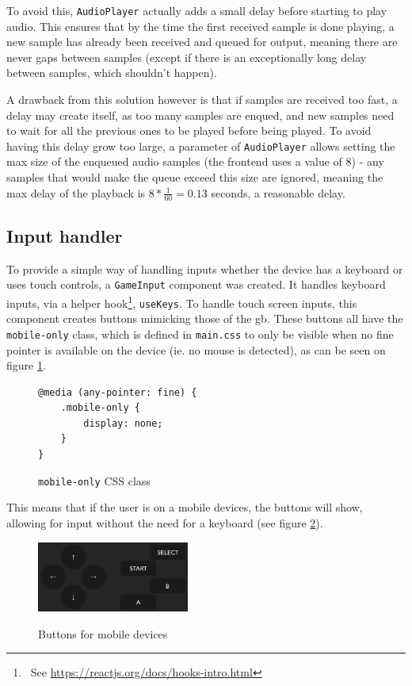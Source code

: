 \documentclass[11pt]{report}
\newcommand{\ftnt}[1]{\footnote{~See \url{#1}}}
\begin{document}
To avoid this, \texttt{AudioPlayer} actually adds a small delay before starting to play audio. This ensures that by the time the first received sample is done playing, a new sample has already been received and queued for output, meaning there are never gaps between samples (except if there is an exceptionally long delay between samples, which shouldn't happen).

A drawback from this solution however is that if samples are received too fast, a delay may create itself, as too many samples are enqued, and new samples need to wait for all the previous ones to be played before being played. To avoid having this delay grow too large, a parameter of \texttt{AudioPlayer} allows setting the max size of the enqueued audio samples (the frontend uses a value of 8) - any samples that would make the queue exceed this size are ignored, meaning the max delay of the playback is $8*\frac{1}{60}=0.13$ seconds, a reasonable delay.

\subsection{Input handler}

To provide a simple way of handling inputs whether the device has a keyboard or uses touch controls, a \texttt{GameInput} component was created. It handles keyboard inputs, via a helper hook\ftnt{https://reactjs.org/docs/hooks-intro.html}, \texttt{useKeys}. To handle touch screen inputs, this component creates buttons mimicking those of the \gls{gb}. These buttons all have the \texttt{mobile-only} class, which is defined in \texttt{main.css} to only be visible when no fine pointer is available on the device (ie. no mouse is detected), as can be seen on figure \ref{fig:css-mobile-only}.

\begin{figure}[h]
    \begin{verbatim}
@media (any-pointer: fine) {
    .mobile-only {
        display: none;
    }
}
    \end{verbatim}
    \caption{\texttt{mobile-only} CSS class}
    \label{fig:css-mobile-only}
\end{figure}

This means that if the user is on a mobile devices, the buttons will show, allowing for input without the need for a keyboard (see figure \ref{fig:ui-mobile-buttons}).

\begin{figure}[h]
    \centering
    \includegraphics[width=5cm]{images/ui-mobile-buttons}\\
    \caption{Buttons for mobile devices}
    \label{fig:ui-mobile-buttons}
\end{figure}
\end{document}
